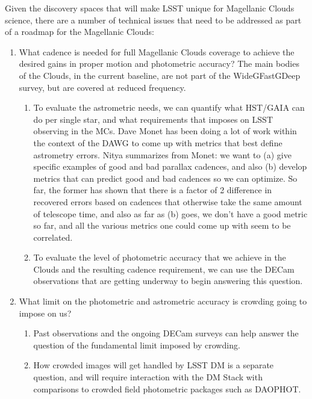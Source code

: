   Given the discovery spaces that will make LSST unique for Magellanic Clouds  science, there are a number of technical issues that need to be addressed as part of a  roadmap for the Magellanic Clouds:  
\begin{enumerate}
\item{What cadence is needed for full Magellanic Clouds coverage to achieve the  desired gains in proper motion and photometric accuracy?  The main bodies  of the Clouds, in the current baseline, are not part of the WideGFastGDeep  survey, but are covered at reduced frequency.  
\begin{enumerate}
\item{To evaluate the astrometric needs, we can quantify what HST/GAIA  can do per single star, and what requirements that imposes on LSST  observing in the MCs.  Dave Monet has been doing a lot of work within  the context of the DAWG to come up with metrics that best define  astrometry errors. Nitya summarizes from Monet: we want to (a) give  
specific examples of good and bad parallax cadences, and also (b)  develop metrics that can predict good and bad cadences so we can  optimize. So far, the former has shown that there is a factor of 2  difference in recovered errors based on cadences that otherwise take  the same amount of telescope time, and also as far as (b) goes, we  don't have a good metric so far, and all the various metrics one could  come up with seem to be correlated.  }

\item{To evaluate the level of photometric accuracy that we achieve in the  Clouds and the resulting cadence requirement, we can use the DECam  observations that are getting underway to begin answering this  question.  }
\end{enumerate}
}
\item{What limit on the photometric and astrometric accuracy is crowding going to  impose on us?  
\begin{enumerate}
\item{Past observations and the ongoing DECam surveys can help answer  the question of the fundamental limit imposed by crowding.  }

\item{How crowded images will get handled by LSST DM is a separate  question, and will require interaction with the DM Stack with  comparisons to crowded field photometric packages such as  DAOPHOT.  }


\end{enumerate}}
\end{enumerate}
